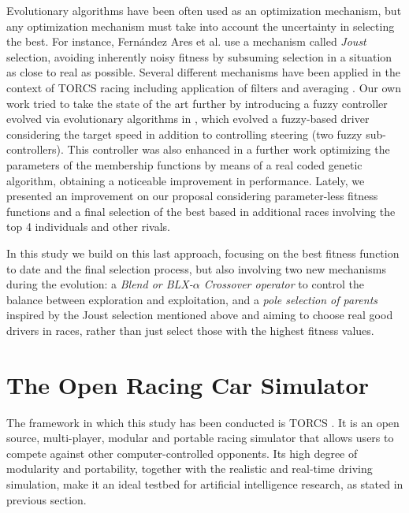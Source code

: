 \documentclass[conference]{IEEEtran}
\begin{document}
Evolutionary algorithms have been often used as an optimization
mechanism, but any optimization mechanism must take into account the
uncertainty in selecting the best. For instance, Fernández Ares et
al. \cite{DBLP:conf/evoW/Fernandez-AresG16} use a mechanism called
{\em Joust} selection, avoiding inherently noisy fitness by subsuming
selection in a situation as close to real as possible. Several
different mechanisms have been applied in the context of TORCS racing
including application of filters \cite{preuss2011torcs} and averaging
\cite{24}.
Our own work tried to take the state of the art further by introducing
a fuzzy controller evolved via evolutionary algorithms in
\cite{salem_evo17}, which evolved a fuzzy-based driver considering the
target speed in addition to controlling steering (two fuzzy
sub-controllers). 
This controller was also enhanced in a further work \cite{salem_evo18}
optimizing the parameters of the membership functions by means of a
real coded genetic algorithm, obtaining a noticeable improvement in
performance. Lately, we presented \cite{salem_cig2018} an improvement on our proposal considering parameter-less fitness functions and a final selection of the best based in additional races involving the top 4 individuals and other rivals.

In this study we build on this last approach, focusing on the best
fitness function to date and the final selection process, but also
involving two new mechanisms during the evolution: a \textit{Blend or BLX-$\alpha$
  Crossover operator} to control the balance between exploration and
exploitation, and a \textit{pole selection of parents} inspired by the
Joust selection mentioned above and aiming
to choose real good drivers in races, rather than just select those
with the highest fitness values. 



\section{The Open Racing Car Simulator}
\label{sec:torcs}

The framework in which this study has been conducted is TORCS \cite{torcs4}. It is an open source, multi-player, modular and portable racing simulator that allows users to compete against other computer-controlled opponents.
Its high degree of modularity and portability, together with the
realistic and real-time driving simulation, make it an ideal testbed
for artificial intelligence research, as stated in previous section.
\end{document}
